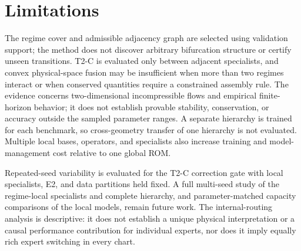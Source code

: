 \section{Limitations}

The regime cover and admissible adjacency graph are selected using validation support;
the method does not discover arbitrary bifurcation structure or certify unseen
transitions. T2-C is evaluated only between adjacent specialists, and convex
physical-space fusion may be insufficient when more than two regimes interact or when
conserved quantities require a constrained assembly rule. The evidence concerns
two-dimensional incompressible flows and empirical finite-horizon behavior; it does not
establish provable stability, conservation, or accuracy outside the sampled parameter
ranges. A separate hierarchy is trained for each benchmark, so cross-geometry transfer
of one hierarchy is not evaluated. Multiple local bases, operators, and specialists also
increase training and model-management cost relative to one global ROM.

Repeated-seed variability is evaluated for the T2-C correction gate with local
specialists, E2, and data partitions held fixed. A full multi-seed study of the
regime-local specialists and complete hierarchy, and parameter-matched capacity
comparisons of the local models, remain future work.
The internal-routing analysis is descriptive: it does not establish a unique
physical interpretation or a causal performance contribution for individual
experts, nor does it imply equally rich expert switching in every chart.

